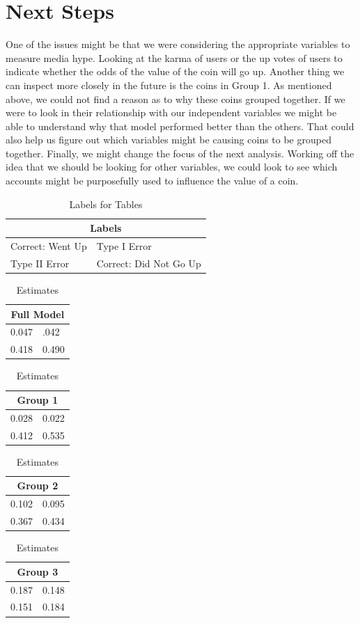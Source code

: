 \documentclass[12pt]{article}
\begin{document}
\section{Next Steps}

\indent\indent One of the issues might be that we were considering the appropriate variables to measure media hype. Looking at the karma of users or the up votes of users to indicate whether the odds of the value of the coin will go up. Another thing we can inspect more closely in the future is the coins in Group 1. As mentioned above, we could not find a reason as to why these coins grouped together. If we were to look in their relationship with our independent variables we might be able to understand why that model performed better than the others. That could also help us figure out which variables might be causing coins to be grouped together. Finally, we might change the focus of the next analysis. Working off the idea that we should be looking for other variables, we could look to see which accounts might be purposefully used to influence the value of a coin.




\begin{table}
\centering
\begin{tabular}{ |p{3cm}|p{3cm}|  }
\hline
\multicolumn{2}{|c|}{Labels} \\
\hline
Correct: Went Up & Type I Error \\
\hline
Type II Error &  Correct: Did Not Go Up \\
\hline
\end{tabular}
\caption{Labels for Tables}
\end{table}


\begin{table}[H]
\begin{tabular}{ |p{3cm}|p{3cm}|  }
\hline
\multicolumn{2}{|c|}{Full Model} \\
\hline
0.047 & .042 \\
\hline
0.418 &  0.490 \\
\hline
\end{tabular}
\quad
\begin{tabular}{ |p{3cm}|p{3cm}|  }
\hline
\multicolumn{2}{|c|}{Group 1} \\
\hline
0.028 & 0.022 \\
\hline
0.412 &  0.535 \\
\hline
\end{tabular}
\quad
\begin{tabular}{ |p{3cm}|p{3cm}|  }
\hline
\multicolumn{2}{|c|}{Group 2} \\
\hline
0.102 & 0.095 \\
\hline
0.367 &  0.434 \\
\hline
\end{tabular}
\quad
\begin{tabular}{ |p{3cm}|p{3cm}|  }
\hline
\multicolumn{2}{|c|}{Group 3} \\
\hline
0.187 & 0.148 \\
\hline
0.151 &  0.184 \\
\hline

\end{tabular}
\caption{Estimates}
\end{table}
\end{document}
